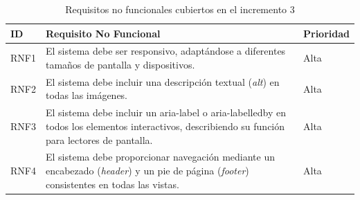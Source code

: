 \begin{table}[H]
    \centering
    \scriptsize
    \begin{tabular}{l p{} l}
    \textbf{ID} & \textbf{Requisito No Funcional} & \textbf{Prioridad} \\ \hline
    RNF1 & El sistema debe ser responsivo, adaptándose a diferentes tamaños de pantalla y dispositivos. & Alta \\ \hline
    RNF2 & El sistema debe incluir una descripción textual (\textit{alt}) en todas las imágenes. & Alta \\ \hline
    RNF3 & El sistema debe incluir un aria-label o aria-labelledby en todos los elementos interactivos, describiendo su función para lectores de pantalla. & Alta \\ \hline
    RNF4 & El sistema debe proporcionar navegación mediante un encabezado (\textit{header}) y un pie de página (\textit{footer}) consistentes en todas las vistas. & Alta \\
    \end{tabular}
    \caption{Requisitos no funcionales cubiertos en el incremento 3}\label{tab:requisitosnofuncionalesincremento3}
\end{table}